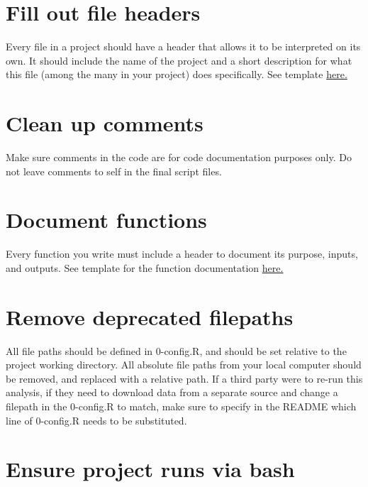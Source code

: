 \documentclass[]{book}
\begin{document}
\hypertarget{fill-out-file-headers}{\section{Fill out file
headers}\label{fill-out-file-headers}}

Every file in a project should have a header that allows it to be
interpreted on its own. It should include the name of the project and a
short description for what this file (among the many in your project)
does specifically. See template
\href{https://jadebc.github.io/lab-manual/coding-practices.html\#file-headers}{here.}

\hypertarget{clean-up-comments}{\section{Clean up
comments}\label{clean-up-comments}}

Make sure comments in the code are for code documentation purposes only.
Do not leave comments to self in the final script files.

\hypertarget{document-functions}{\section{Document
functions}\label{document-functions}}

Every function you write must include a header to document its purpose,
inputs, and outputs. See template for the function documentation
\href{https://jadebc.github.io/lab-manual/coding-practices.html\#function-documentation}{here.}

\hypertarget{remove-deprecated-filepaths}{\section{Remove deprecated
filepaths}\label{remove-deprecated-filepaths}}

All file paths should be defined in 0-config.R, and should be set
relative to the project working directory. All absolute file paths from
your local computer should be removed, and replaced with a relative
path. If a third party were to re-run this analysis, if they need to
download data from a separate source and change a filepath in the
0-config.R to match, make sure to specify in the README which line of
0-config.R needs to be substituted.

\hypertarget{ensure-project-runs-via-bash}{\section{Ensure project runs
via bash}\label{ensure-project-runs-via-bash}}
\end{document}
